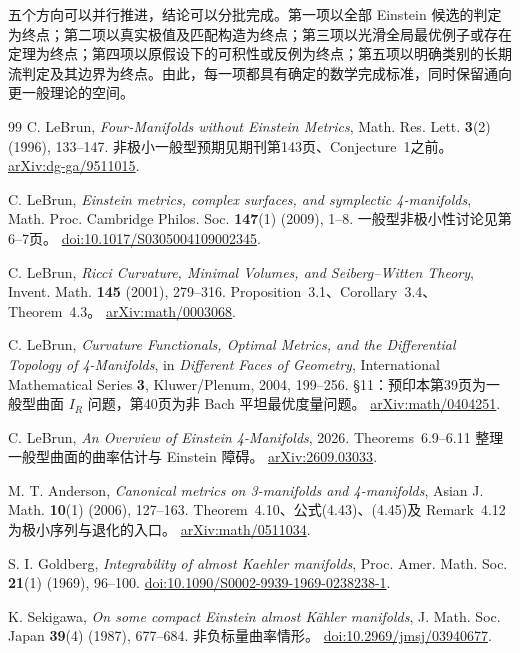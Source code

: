 \documentclass[11pt,a4paper]{article}
\theoremstyle{definition}
\numberwithin{equation}{section}
\begin{document}
五个方向可以并行推进，结论可以分批完成。第一项以全部 Einstein 候选的判定为终点；第二项以真实极值及匹配构造为终点；第三项以光滑全局最优例子或存在定理为终点；第四项以原假设下的可积性或反例为终点；第五项以明确类别的长期流判定及其边界为终点。由此，每一项都具有确定的数学完成标准，同时保留通向更一般理论的空间。

\newpage
\begin{thebibliography}{99}
\small
{}
C. LeBrun, \emph{Four-Manifolds without Einstein Metrics}, Math. Res. Lett. \textbf{3}(2) (1996), 133--147.
非极小一般型预期见期刊第143页、Conjecture~1之前。
\href{https://arxiv.org/abs/dg-ga/9511015}{arXiv:dg-ga/9511015}.

C. LeBrun, \emph{Einstein metrics, complex surfaces, and symplectic 4-manifolds}, Math. Proc. Cambridge Philos. Soc. \textbf{147}(1) (2009), 1--8.
一般型非极小性讨论见第6--7页。
\href{https://doi.org/10.1017/S0305004109002345}{doi:10.1017/S0305004109002345}.

C. LeBrun, \emph{Ricci Curvature, Minimal Volumes, and Seiberg--Witten Theory}, Invent. Math. \textbf{145} (2001), 279--316.
Proposition~3.1、Corollary~3.4、Theorem~4.3。
\href{https://arxiv.org/abs/math/0003068}{arXiv:math/0003068}.

C. LeBrun, \emph{Curvature Functionals, Optimal Metrics, and the Differential Topology of 4-Manifolds}, in \emph{Different Faces of Geometry}, International Mathematical Series \textbf{3}, Kluwer/Plenum, 2004, 199--256.
\S11：预印本第39页为一般型曲面 $I_R$ 问题，第40页为非 Bach 平坦最优度量问题。
\href{https://arxiv.org/abs/math/0404251}{arXiv:math/0404251}.

C. LeBrun, \emph{An Overview of Einstein 4-Manifolds}, 2026.
Theorems~6.9--6.11 整理一般型曲面的曲率估计与 Einstein 障碍。
\href{https://arxiv.org/abs/2609.03033}{arXiv:2609.03033}.

M. T. Anderson, \emph{Canonical metrics on 3-manifolds and 4-manifolds}, Asian J. Math. \textbf{10}(1) (2006), 127--163.
Theorem~4.10、公式(4.43)、(4.45)及 Remark~4.12 为极小序列与退化的入口。
\href{https://arxiv.org/abs/math/0511034}{arXiv:math/0511034}.

S. I. Goldberg, \emph{Integrability of almost Kaehler manifolds}, Proc. Amer. Math. Soc. \textbf{21}(1) (1969), 96--100.
\href{https://doi.org/10.1090/S0002-9939-1969-0238238-1}{doi:10.1090/S0002-9939-1969-0238238-1}.

K. Sekigawa, \emph{On some compact Einstein almost K{\latin\"a}hler manifolds}, J. Math. Soc. Japan \textbf{39}(4) (1987), 677--684.
非负标量曲率情形。
\href{https://doi.org/10.2969/jmsj/03940677}{doi:10.2969/jmsj/03940677}.


\end{thebibliography}
\end{document}
